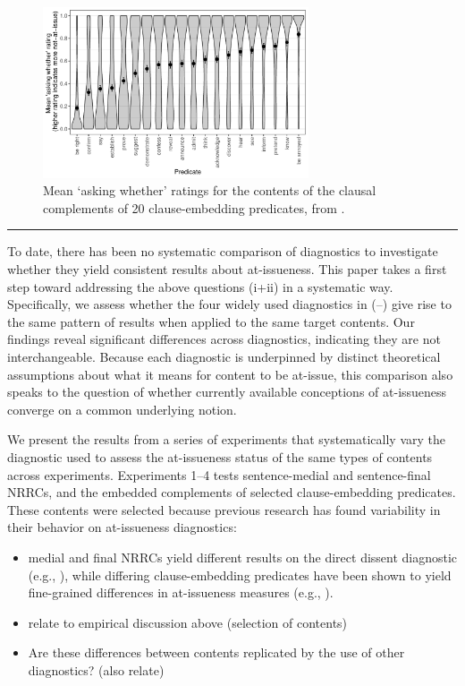 \documentclass[times,linguex,xcolor]{glossa}
\begin{document}
  
  \begin{figure}[h!]
    \centering

    \includegraphics[width=0.7\textwidth]{../../results/degen-tonhauser-glossa/graphs/mean-asking-whether-ratings.pdf}

    \caption{Mean `asking whether' ratings for the contents of the clausal complements of 20 clause-embedding predicates, from \citealt{degen-tonhauser-glossa}.}
    \label{fig:dtglossa}
  \end{figure}
  
  \bigskip \hrule\bigskip


  To date, there has been no systematic comparison of diagnostics to investigate whether they yield consistent results about at-issueness.
  This paper takes a first step toward addressing the above questions (i+ii) in a systematic way. Specifically, we assess whether the four widely used diagnostics in (--) give rise to the same pattern of results when applied to the same target contents. Our findings reveal significant differences across diagnostics, indicating they are not interchangeable. Because each diagnostic is underpinned by distinct theoretical assumptions about what it means for content to be at-issue, this comparison also speaks to the question of whether currently available conceptions of at-issueness converge on a common underlying notion.

  We present the results from a series of experiments that systematically vary the diagnostic used to assess the at-issueness status of the same types of contents across experiments. Experiments 1--4 tests sentence-medial and sentence-final NRRCs, and the embedded complements of selected clause-embedding predicates. These contents were selected because previous research has found variability in their behavior on at-issueness diagnostics:
  \begin{itemize}
    \item medial and final NRRCs yield different results on the direct dissent diagnostic (e.g., \citealt{syrett_experimental_2015}), while differing clause-embedding predicates have been shown to yield fine-grained differences in at-issueness measures (e.g., \citealt{tonhauser_how_2018,degen-tonhauser-glossa}).
    \item relate to empirical discussion above (selection of contents)
    \item Are these differences between contents replicated by the use of other diagnostics? (also relate)
  \end{itemize}
\end{document}
